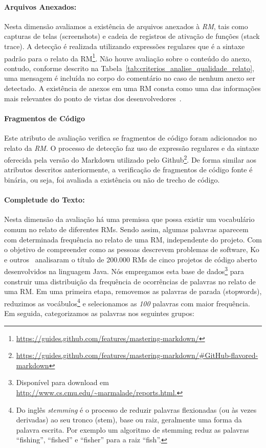 \paragraph{Arquivos Anexados:}
\label{par:arquivos_anexados}

Nesta dimensão avaliamos a existência de arquivos anexados à \textit{RM}, tais
como capturas de telas (screenshots) e cadeia de registros de ativação de
funções (stack trace). A detecção é realizada utilizando expressões regulares
que é a sintaxe padrão para o relato da
RM\footnote{\url{https://guides.github.com/features/mastering-markdown/}}. Não
houve avaliação sobre o conteúdo do anexo, contudo, conforme descrito na
Tabela~\ref{tab:criterios_analise_qualidade_relato}, uma mensagem é incluída no
corpo do comentário no caso de nenhum anexo ser detectado. A existência de
anexos em uma RM consta como uma das informações mais relevantes do ponto de
vistas dos desenvolvedores~\cite{bettenburg2008makes}.

\paragraph{Fragmentos de Código}
\label{par:fragmentos_de_código}

Este atributo de avaliação verifica se fragmentos de código foram adicionados no
relato da \textit{RM}. O processo de detecção faz uso de expressão regulares
e da sintaxe oferecida pela versão do Markdown utilizado pelo
Github\footnote{\url{https://guides.github.com/features/mastering-markdown/\#GitHub-flavored-markdown}}.
De forma similar aos atributos descritos anteriormente, a verificação de
fragmentos de código fonte é binária, ou seja, foi avaliada a existência ou não
de trecho de código.

\paragraph{Completude do Texto:}
\label{par:completude_de_palavras_chaves}

Nesta dimensão da avaliação há uma premissa que possa existir um vocabulário
comum no relato de diferentes RMs. Sendo assim, algumas palavras aparecem com
determinada frequência no relato de uma RM, independente do projeto. Com o
objetivo de compreender como as pessoas descrevem problemas de software, Ko e
outros~\cite{ko2006linguistic} analisaram o título de 200.000 RMs de cinco
projetos de código aberto desenvolvidos na linguagem Java. Nós empregamos esta
base de dados\footnote{Disponível para download em
    \url{http://www.cs.cmu.edu/~marmalade/reports.html.}} para construir uma
distribuição da frequência de ocorrências de palavras no relato de uma RM\@.  Em
uma primeira etapa, removemos as palavras de parada (stopwords), reduzimos as
vocábulos\footnote{Do inglês \textit{stemming} é o processo de reduzir palavras
    flexionadas (ou às vezes derivadas) ao seu tronco (stem), base ou raiz,
    geralmente uma forma da palavra escrita. Por exemplo um algoritmo de
    stemming reduz as palavras ``fishing'', ``fished'' e ``fisher'' para a raiz
    ``fish''.} e selecionamos as \textit{100} palavras com maior frequência. Em
seguida, categorizamos as palavras nos seguintes grupos:

